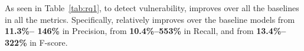 As seen in Table~\ref{tab:rq1}, to detect vulnerability, {\tool}
improves over all the baselines in all the metrics. Specifically,
{\tool} relatively improves over the baseline models from {\bf 11.3\%--
  146\%} in Precision, from {\bf 10.4\%--553\%} in Recall, and from
{\bf 13.4\%--322\%} in F-score.







